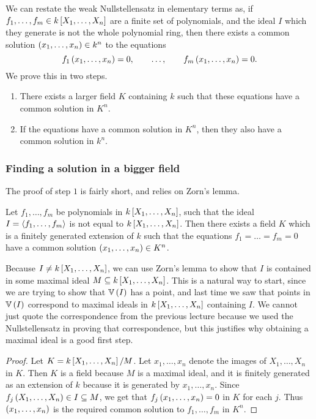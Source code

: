 
We can restate the weak Nullstellensatz in elementary terms as, if $ f_1, \dots, f_m \in k\sbr{X_1, \dots, X_n} $ are a finite set of polynomials, and the ideal $ I $ which they generate is not the whole polynomial ring, then there exists a common solution $ \br{x_1, \dots, x_n} \in k^n $ to the equations
$$ f_1\br{x_1, \dots, x_n} = 0, \qquad \dots, \qquad f_m\br{x_1, \dots, x_n} = 0. $$
We prove this in two steps.
\begin{enumerate}[label=Step \arabic*., leftmargin=0.5in]
\item There exists a larger field $ K $ containing $ k $ such that these equations have a common solution in $ K^n $.
\item If the equations have a common solution in $ K^n $, then they also have a common solution in $ k^n $.
\end{enumerate}

\subsubsection{Finding a solution in a bigger field}

The proof of step $ 1 $ is fairly short, and relies on Zorn's lemma.

\begin{lemma}
Let $ f_1, \dots, f_m $ be polynomials in $ k\sbr{X_1, \dots, X_n} $, such that the ideal $ I = \left\langle f_1, \dots, f_m \right\rangle $ is not equal to $ k\sbr{X_1, \dots, X_n} $. Then there exists a field $ K $ which is a finitely generated extension of $ k $ such that the equations $ f_1 = \dots = f_m = 0 $ have a common solution $ \br{x_1, \dots, x_n} \in K^n $.
\end{lemma}

Because $ I \ne k\sbr{X_1, \dots, X_n} $, we can use Zorn's lemma to show that $ I $ is contained in some maximal ideal $ M \subseteq k\sbr{X_1, \dots, X_n} $. This is a natural way to start, since we are trying to show that $ \VV\br{I} $ has a point, and last time we saw that points in $ \VV\br{I} $ correspond to maximal ideals in $ k\sbr{X_1, \dots, X_n} $ containing $ I $. We cannot just quote the correspondence from the previous lecture because we used the Nullstellensatz in proving that correspondence, but this justifies why obtaining a maximal ideal is a good first step.

\begin{proof}
Let $ K = k\sbr{X_1, \dots, X_n} / M $. Let $ x_1, \dots, x_n $ denote the images of $ X_1, \dots, X_n $ in $ K $. Then $ K $ is a field because $ M $ is a maximal ideal, and it is finitely generated as an extension of $ k $ because it is generated by $ x_1, \dots, x_n $. Since $ f_j\br{X_1, \dots, X_n} \in I \subseteq M $, we get that $ f_j\br{x_1, \dots, x_n} = 0 $ in $ K $ for each $ j $. Thus $ \br{x_1, \dots, x_n} $ is the required common solution to $ f_1, \dots, f_m $ in $ K^n $.
\end{proof}

